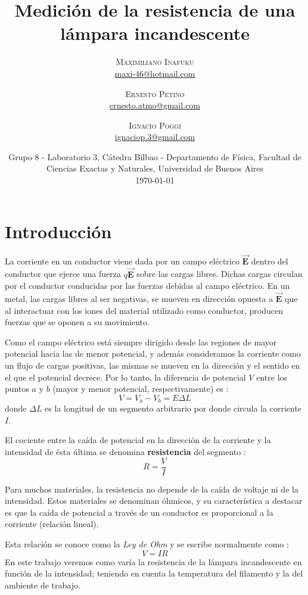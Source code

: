 \documentclass[twoside,twocolumn,a4paper]{article}
\title{Medici\'on de la resistencia de una l\'ampara incandescente} %
\author{%
\textsc{Maximiliano Inafuku} \\[1ex] %
\normalsize \href{mailto:maxi-46@hotmail.com}{maxi-46@hotmail.com} %
\and %
\textsc{Ernesto Petino} \\[1ex] %
\normalsize \href{mailto:ernesto.atmo@gmail.com}{ernesto.atmo@gmail.com} %
\and %
\textsc{Ignacio Poggi} \\[1ex] %
\normalsize \href{mailto:ignaciop.3@gmail.com}{ignaciop.3@gmail.com} %
}
\date{Grupo 8 - Laboratorio 3, C\'atedra Bilbao - Departamento de F\'isica, Facultad de Ciencias Exactas y Naturales, Universidad de Buenos Aires \newline \\ \today} %
\begin{document}
\maketitle


\section{Introducci\'on}

La corriente en un conductor viene dada por un campo el\'ectrico $\mathbf{\vec{E}}$ dentro del conductor que ejerce una fuerza $q\mathbf{\vec{E}}$ sobre las cargas libres. Dichas cargas circulan por el conductor conducidas por las fuerzas debidas al campo el\'ectrico. En un metal, las cargas libres al ser negativas, se mueven en direcci\'on opuesta a $\mathbf{\vec{E}}$ que al interactuar con los iones del material utilizado como conductor, producen fuerzas que se oponen a su movimiento.\par
Como el campo el\'ectrico est\'a siempre dirigido desde las regiones de mayor potencial hacia las de menor potencial, y adem\'as consideramos la corriente como un flujo de cargas positivas, las mismas se mueven en la direcci\'on y el sentido en el que el potencial decrece. Por lo tanto, la diferencia de potencial $V$ entre los puntos $a$ y $b$ (mayor y menor potencial, respectivamente) es \cite{eq:potencial}:
\begin{equation}
\label{eq:potencial}
V = V_{a} - V_{b} = E\Delta L
\end{equation}
donde $\Delta L$ es la longitud de un segmento arbitrario por donde circula la corriente $I$.
\par El cociente entre la ca\'ida de potencial en la direcci\'on de la corriente y la intensidad de \'esta \'ultima se denomina \textbf{resistencia} del segmento \cite{eq:ohm1}:
\begin{equation}
\label{eq:ohm1}
R = \frac{V}{I}
\end{equation}
\par Para muchos materiales, la resistencia no depende de la ca\'ida de voltaje ni de la intensidad. Estos materiales se denominan  \'ohmicos, y su caracter\'istica a destacar es que la ca\'ida de potencial a trav\'es de un conductor es proporcional a la corriente (relaci\'on lineal).
\par Esta relaci\'on se conoce como la \textit{Ley de Ohm} y se escribe normalmente como \cite{eq:ohm2}:
\begin{equation}
\label{eq:ohm2}
V = IR
\end{equation}
En este trabajo veremos como var\'ia la resistencia de la l\'ampara incandescente en funci\'on de la intensidad; teniendo en cuenta la temperatura del filamento y la del ambiente de trabajo.
\end{document}

